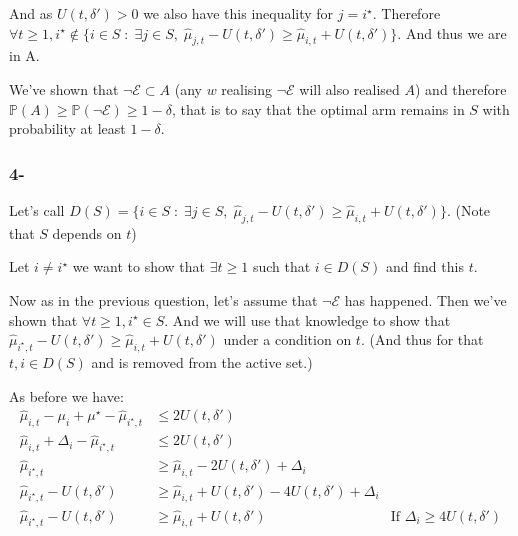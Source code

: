 \documentclass[a4paper]{article}
\newcommand{\wh}[1]{\widehat{#1}}
\begin{document}
And as $U(t, \delta') > 0$ we also have this inequality for $j = i^\star$. Therefore
$\forall t \ge 1, i^\star \notin \Big\{i \in S \;:\; \exists j \in S,\; \wh{\mu}_{j,t} - U(t,\delta') \geq \wh{\mu}_{i,t} + U(t, \delta')  \Big\}$.
And thus we are in A.

We've shown that $\neg\mathcal{E} \subset A $ (any $w$ realising $\neg\mathcal{E}$ will also realised $A$) and therefore
$\boxed{\mathbb{P}(A) \ge \mathbb{P}(\neg \mathcal{E}) \ge 1 - \delta}$, that is to say that the optimal arm remains in $S$ with probability at least
$1 - \delta$.

\subsubsection*{4-}

Let's call $D(S) = \Big\{i \in S \;:\; \exists j \in S,\; \wh{\mu}_{j,t} - U(t,\delta') \geq \wh{\mu}_{i,t} + U(t, \delta')  \Big\}$. (Note that
$S$ depends on $t$)

Let $i \neq i^\star$ we want to show that $\exists t \ge 1$ such that $i \in D(S)$ and find this $t$.

Now as in the previous question, let's assume that $\neg \mathcal{E}$ has happened. Then we've shown that $\forall t \ge 1, i^\star \in S$. And we will use
that knowledge to show that $\wh{\mu}_{i^\star,t} - U(t,\delta') \geq \wh{\mu}_{i,t} + U(t, \delta')$ under a condition on $t$.
(And thus for that $t, i \in D(S)$ and is removed from the active set.)

As before we have:
\begin{equation*}
    \begin{aligned}
        \wh{\mu}_{i,t} - \mu_i + \mu^\star - \wh{\mu}_{i^\star,t} & \le 2U(t,\delta')                                                                                               \\
        \wh{\mu}_{i,t} + \Delta_i - \wh{\mu}_{i^\star,t}          & \le 2U(t,\delta')                                                                                               \\
        \wh{\mu}_{i^\star,t}                                      & \ge \wh{\mu}_{i,t} - 2U(t, \delta') + \Delta_i                                                                  \\
        \wh{\mu}_{i^\star,t} - U(t, \delta')                      & \ge \wh{\mu}_{i,t} + U(t, \delta') - 4U(t, \delta') + \Delta_i                                                  \\
        \wh{\mu}_{i^\star,t} - U(t, \delta')                      & \ge \wh{\mu}_{i,t} + U(t, \delta')                             & \text{If } \boxed{\Delta_i \ge 4U(t, \delta')} \\
    \end{aligned}
\end{equation*}
\end{document}
